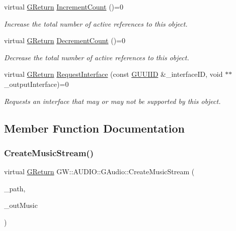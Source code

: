 \begin{DoxyCompactItemize}
virtual \mbox{\hyperlink{namespaceGW_a67a839e3df7ea8a5c5686613a7a3de21}{G\+Return}} \mbox{\hyperlink{classGW_1_1AUDIO_1_1GAudio_aba5697a3a308026ecaa12737d6fe6705}{Increment\+Count}} ()=0
\begin{DoxyCompactList}\small\item\em Increase the total number of active references to this object. \end{DoxyCompactList}\item 
virtual \mbox{\hyperlink{namespaceGW_a67a839e3df7ea8a5c5686613a7a3de21}{G\+Return}} \mbox{\hyperlink{classGW_1_1AUDIO_1_1GAudio_a9bdc3d4a8668b702db98dde91a0fa423}{Decrement\+Count}} ()=0
\begin{DoxyCompactList}\small\item\em Decrease the total number of active references to this object. \end{DoxyCompactList}\item 
virtual \mbox{\hyperlink{namespaceGW_a67a839e3df7ea8a5c5686613a7a3de21}{G\+Return}} \mbox{\hyperlink{classGW_1_1AUDIO_1_1GAudio_a29561ad9852a36dd14746adbaac21c80}{Request\+Interface}} (const \mbox{\hyperlink{structGW_1_1GUUIID}{G\+U\+U\+I\+ID}} \&\+\_\+interface\+ID, void $\ast$$\ast$\+\_\+output\+Interface)=0
\begin{DoxyCompactList}\small\item\em Requests an interface that may or may not be supported by this object. \end{DoxyCompactList}\end{DoxyCompactItemize}


\subsection{Member Function Documentation}
\mbox{\label{classGW_1_1AUDIO_1_1GAudio_a7a09604e225f901a67748faa3723b2c8}} 
\subsubsection{\texorpdfstring{CreateMusicStream()}{CreateMusicStream()}}
{\footnotesize\ttfamily virtual \mbox{\hyperlink{namespaceGW_a67a839e3df7ea8a5c5686613a7a3de21}{G\+Return}} G\+W\+::\+A\+U\+D\+I\+O\+::\+G\+Audio\+::\+Create\+Music\+Stream (\begin{DoxyParamCaption}\item[{const char $\ast$}]{\+\_\+path,  }\item[{\mbox{\hyperlink{classGW_1_1AUDIO_1_1GMusic}{G\+Music}} $\ast$$\ast$}]{\+\_\+out\+Music }\end{DoxyParamCaption})\hspace{0.3cm}{\ttfamily [pure virtual]}}



